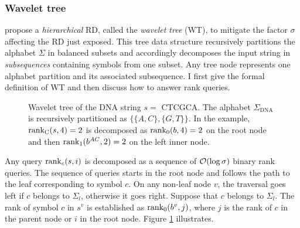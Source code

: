 \subsubsection{Wavelet tree}

\citeauthor{Grossi2003} propose a \emph{hierarchical} RD, called the \emph{wavelet tree} (WT), to mitigate the factor $\sigma$ affecting the RD just exposed.
This tree data structure recursively partitions the alphabet $\Sigma$ in balanced subsets and accordingly decomposes the input string in \emph{subsequences} containing symbols from one subset.
Any tree node represents one alphabet partition and its associated subsequence.
I first give the formal definition of WT and then discuss how to answer rank queries.


\begin{figure}[b]
\begin{center}
\caption[Example of wavelet tree]{Wavelet tree of the DNA string $s=$ {\ttfamily CTCGCA}. The alphabet $\Sigma_{\text{DNA}}$ is recursively partitioned as $\{ \{A,C\}, \{G,T\} \}$. In the example, $\text{rank}_{\text{C}}(s,4)=2$ is decomposed as $\text{rank}_0(b,4) = 2$ on the root node and then $\text{rank}_1(b^{AC}, 2) = 2$ on the left inner node.}
\label{fig:wt_dna}
\ttfamily

\end{center}
\end{figure}

Any query $\text{rank}_c(s,i)$ is decomposed as a sequence of $\mathcal{O}(\log{\sigma})$ binary rank queries.
The sequence of queries starts in the root node and follows the path to the leaf corresponding to symbol $c$.
On any non-leaf node $v$, the traversal goes left if $c$ belongs to $\Sigma_l$, otherwise it goes right.
Suppose \wlogs that $c$ belongs to $\Sigma_l$.
The rank of symbol $c$ in $s^v$ is established as $\text{rank}_0(b^v, j)$, where $j$ is the rank of $c$ in the parent node or $i$ in the root node.
Figure \ref{fig:wt_dna} illustrates.


